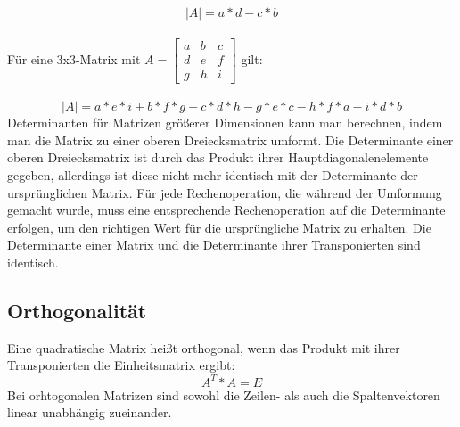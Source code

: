 \documentclass[11pt]{scrreprt}
\begin{document}
\begin{equation}
|A| = a*d - c*b
\end {equation}
\\
Für eine 3x3-Matrix mit $
A = 
\begin{bmatrix}
a & b & c \\
d & e & f \\
g & h & i
\end{bmatrix}
$  gilt:
\\
\\
\begin {equation}
|A| = a*e*i + b*f*g + c*d*h - g*e*c - h*f*a - i*d*b
\end {equation}
Determinanten für Matrizen größerer Dimensionen kann man berechnen, indem man die Matrix zu einer oberen Dreiecksmatrix umformt. Die Determinante einer oberen Dreiecksmatrix ist durch das Produkt ihrer Hauptdiagonalenelemente gegeben, allerdings ist diese nicht mehr identisch mit der Determinante der ursprünglichen Matrix. Für jede Rechenoperation, die während der Umformung gemacht wurde, muss eine entsprechende Rechenoperation auf die Determinante erfolgen, um den richtigen Wert für die ursprüngliche Matrix zu erhalten.
Die Determinante einer Matrix und die Determinante ihrer Transponierten sind identisch.
\subsection{Orthogonalität}
Eine quadratische Matrix heißt orthogonal, wenn das Produkt mit ihrer Transponierten die Einheitsmatrix ergibt:
\begin{equation}
A^T * A = E
\end{equation}
Bei orhtogonalen Matrizen sind sowohl die Zeilen- als  auch die Spaltenvektoren linear unabhängig zueinander.
\end{document}
